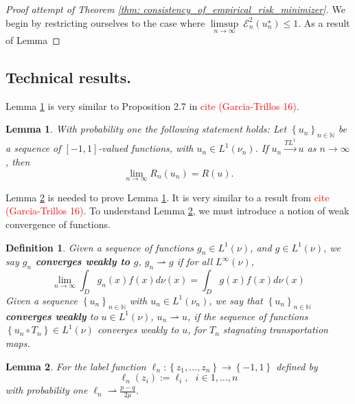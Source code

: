 \documentclass{article}
\newcommand{\set}[1]{\left\{#1\right\}}
\newcommand{\seq}[1]{\set{#1}_{n \in \N}}
\newcommand{\N}{\mathbb{N}}
\newcommand{\E}{\mathcal{E}}
\theoremstyle{alden}
\newtheorem{definition}{Definition}[section]
\theoremstyle{aldenthm}
\newtheorem{lemma}{Lemma}
\theoremstyle{remark}
\begin{document}
\begin{proof}[Proof attempt of Theorem \ref{thm: consistency_of_empirical_risk_minimizer}]
	
We begin by restricting ourselves to the case where $\underset{n \to \infty}{\limsup}~ \E_n^2(u_n^{\star}) \leq 1$.
As a result of Lemma 
\end{proof}
\subsection{Technical results.}

Lemma \ref{lem: conv_of_risk_functional} is very similar to Proposition 2.7 in \textcolor{red}{cite (Garcia-Trillos 16)}.  
\begin{lemma}
	\label{lem: conv_of_risk_functional}
	With probability one the following statement holds: Let $\seq{u_n}$ be a sequence of $[-1,1]$-valued functions, with $u_n \in L^1(\nu_n)$. If $u_n \overset{TL^1}{\to} u$ as $n \to \infty$, then
	\begin{equation*}
	\lim_{n \to \infty} R_n(u_n) = R(u).
	\end{equation*}
\end{lemma}

Lemma \ref{lem: weak_limit_of_label_function} is needed to prove Lemma \ref{lem: conv_of_risk_functional}. It is very similar to a result from \textcolor{red}{cite (Garcia-Trillos 16)}. To understand Lemma \ref{lem: weak_limit_of_label_function}, we must introduce a notion of weak convergence of functions.

\begin{definition}
	Given a sequence of functions $g_n \in L^1(\nu)$, and $g \in L^1(\nu)$, we say \textbf{$g_n$ converges weakly to $g$}, $g_n \rightharpoonup g$ if for all $L^{\infty}(\nu)$,
	\begin{equation*}
	\lim_{n \to \infty} \int_D g_n(x) f(x) d\nu(x) = \int_D g(x) f(x) d\nu(x)
	\end{equation*}
	Given a sequence $\seq{u_n}$ with $u_n \in L^1(\nu_n)$, we say that $\seq{u_n}$ \textbf{converges weakly} to $u \in L^1(\nu)$, $u_n \rightharpoonup u$,  if the sequence of functions $\set{u_n \circ T_n} \in L^1(\nu)$ converges weakly to $u$, for $T_n$ stagnating transportation maps.
\end{definition}

\begin{lemma}
	\label{lem: weak_limit_of_label_function}
	For the label function $\ell_n: \set{z_1, \ldots, z_n} \to \set{-1,1}$ defined by
	\begin{equation}
	\label{eqn: label_function}
	\ell_n(z_i) := \ell_i, ~~~ i \in 1,\ldots,n
	\end{equation}
	with probability one $\ell_n \rightharpoonup \frac{p - q}{2 \mu}$. 
\end{lemma}
\end{document}
